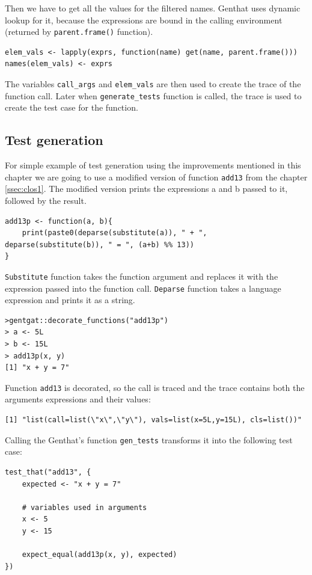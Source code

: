 \documentclass[thesis=B,english]{FITthesis}[2012/10/20]
\begin{document}
Then we have to get all the values for the filtered names. Genthat uses dynamic lookup for it, because the expressions are bound in the calling environment (returned by \verb|parent.frame()| function).

\begin{verbatim}
elem_vals <- lapply(exprs, function(name) get(name, parent.frame()))
names(elem_vals) <- exprs
\end{verbatim}

The variables \verb|call_args| and \verb|elem_vals| are then used to create the trace of the function call. Later when \verb|generate_tests| function is called, the trace is used to create the test case for the function.

\subsection{Test generation}
For simple example of test generation using the improvements mentioned in this chapter we are going to use a modified version of function \verb|add13| from the chapter \ref{ssec:clos1}. The modified version prints the expressions a and b passed to it, followed by the result.

\begin{verbatim}
add13p <- function(a, b){
	print(paste0(deparse(substitute(a)), " + ", deparse(substitute(b)), " = ", (a+b) %% 13))
}
\end{verbatim}

\verb|Substitute| function takes the function argument and replaces it with the expression passed into the function call. \verb|Deparse| function takes a language expression and prints it as a string.

\begin{verbatim}
>gentgat::decorate_functions("add13p")
> a <- 5L
> b <- 15L
> add13p(x, y)
[1] "x + y = 7"
\end{verbatim}

Function \verb|add13| is decorated, so the call is traced and the trace contains both the arguments expressions and their values:

\begin{verbatim}
[1] "list(call=list(\"x\",\"y\"), vals=list(x=5L,y=15L), cls=list())"
\end{verbatim}

Calling the Genthat’s function \verb|gen_tests| transforms it into the following test case:

\begin{verbatim}
test_that("add13", {
    expected <- "x + y = 7"

    # variables used in arguments
    x <- 5
    y <- 15

    expect_equal(add13p(x, y), expected)
})
\end{verbatim}
\end{document}
